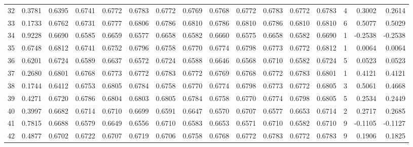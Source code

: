 \begin{tabular}{lrrrrrrrrrrrrrrr}
32  &      0.3781 &  0.6395 &  0.6741 &  0.6772 &  0.6783 &  0.6772 &  0.6769 &  0.6768 &  0.6772 &  0.6783 &   0.6772 &     0.6783 &      4 &                    0.3002 &                     0.2614 \\
33  &      0.1733 &  0.6762 &  0.6731 &  0.6777 &  0.6806 &  0.6786 &  0.6810 &  0.6786 &  0.6810 &  0.6786 &   0.6810 &     0.6810 &      6 &                    0.5077 &                     0.5029 \\
34  &      0.9228 &  0.6690 &  0.6585 &  0.6659 &  0.6577 &  0.6658 &  0.6582 &  0.6660 &  0.6575 &  0.6658 &   0.6582 &     0.6690 &      1 &                   -0.2538 &                    -0.2538 \\
35  &      0.6748 &  0.6812 &  0.6741 &  0.6752 &  0.6796 &  0.6758 &  0.6770 &  0.6774 &  0.6798 &  0.6773 &   0.6772 &     0.6812 &      1 &                    0.0064 &                     0.0064 \\
36  &      0.6201 &  0.6724 &  0.6589 &  0.6637 &  0.6572 &  0.6724 &  0.6588 &  0.6646 &  0.6568 &  0.6710 &   0.6582 &     0.6724 &      5 &                    0.0523 &                     0.0523 \\
37  &      0.2680 &  0.6801 &  0.6768 &  0.6773 &  0.6772 &  0.6783 &  0.6772 &  0.6769 &  0.6768 &  0.6772 &   0.6783 &     0.6801 &      1 &                    0.4121 &                     0.4121 \\
38  &      0.1744 &  0.6412 &  0.6753 &  0.6805 &  0.6784 &  0.6758 &  0.6770 &  0.6774 &  0.6798 &  0.6773 &   0.6772 &     0.6805 &      3 &                    0.5061 &                     0.4668 \\
39  &      0.4271 &  0.6720 &  0.6786 &  0.6804 &  0.6803 &  0.6805 &  0.6784 &  0.6758 &  0.6770 &  0.6774 &   0.6798 &     0.6805 &      5 &                    0.2534 &                     0.2449 \\
40  &      0.3997 &  0.6682 &  0.6714 &  0.6710 &  0.6699 &  0.6591 &  0.6647 &  0.6570 &  0.6707 &  0.6577 &   0.6653 &     0.6714 &      2 &                    0.2717 &                     0.2685 \\
41  &      0.7815 &  0.6688 &  0.6579 &  0.6649 &  0.6556 &  0.6710 &  0.6583 &  0.6653 &  0.6571 &  0.6710 &   0.6582 &     0.6710 &      9 &                   -0.1105 &                    -0.1127 \\
42  &      0.4877 &  0.6702 &  0.6722 &  0.6707 &  0.6719 &  0.6706 &  0.6758 &  0.6768 &  0.6772 &  0.6783 &   0.6772 &     0.6783 &      9 &                    0.1906 &                     0.1825 \\

\end{tabular}
